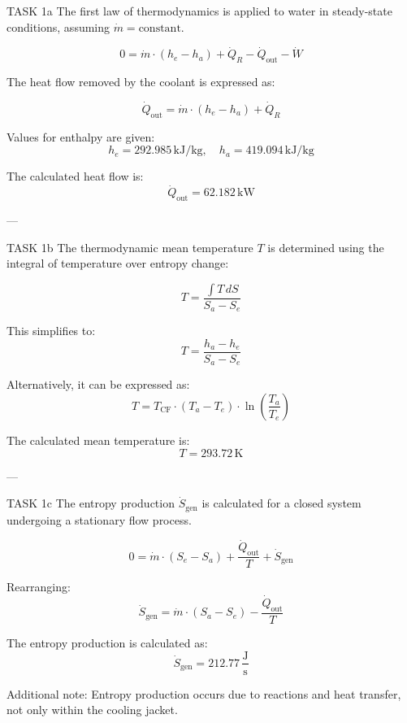 TASK 1a  
The first law of thermodynamics is applied to water in steady-state conditions, assuming \( \dot{m} = \text{constant} \).  

\[
0 = \dot{m} \cdot (h_e - h_a) + \dot{Q}_R - \dot{Q}_{\text{out}} - \dot{W}
\]

The heat flow removed by the coolant is expressed as:  

\[
\dot{Q}_{\text{out}} = \dot{m} \cdot (h_e - h_a) + \dot{Q}_R
\]

Values for enthalpy are given:  
\[
h_e = 292.985 \, \text{kJ/kg}, \quad h_a = 419.094 \, \text{kJ/kg}
\]

The calculated heat flow is:  
\[
\dot{Q}_{\text{out}} = 62.182 \, \text{kW}
\]

---

TASK 1b  
The thermodynamic mean temperature \( T \) is determined using the integral of temperature over entropy change:  

\[
T = \frac{\int T \, dS}{S_a - S_e}
\]

This simplifies to:  
\[
T = \frac{h_a - h_e}{S_a - S_e}
\]

Alternatively, it can be expressed as:  
\[
T = T_{\text{CF}} \cdot (T_a - T_e) \cdot \ln \left( \frac{T_a}{T_e} \right)
\]

The calculated mean temperature is:  
\[
T = 293.72 \, \text{K}
\]

---

TASK 1c  
The entropy production \( \dot{S}_{\text{gen}} \) is calculated for a closed system undergoing a stationary flow process.  

\[
0 = \dot{m} \cdot (S_e - S_a) + \frac{\dot{Q}_{\text{out}}}{T} + \dot{S}_{\text{gen}}
\]

Rearranging:  
\[
\dot{S}_{\text{gen}} = \dot{m} \cdot (S_a - S_e) - \frac{\dot{Q}_{\text{out}}}{T}
\]

The entropy production is calculated as:  
\[
\dot{S}_{\text{gen}} = 212.77 \, \frac{\text{J}}{\text{s}}
\]

Additional note: Entropy production occurs due to reactions and heat transfer, not only within the cooling jacket.